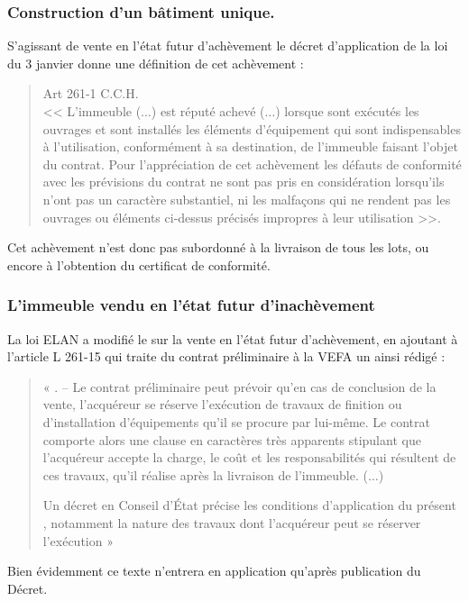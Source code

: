 		\subsubsection{Construction d'un bâtiment unique.}
		
			S'agissant de vente en l'état futur d'achèvement le décret d'application de la loi du 3 janvier donne une définition de cet achèvement :
			\begin{quote}
			Art 261-1 C.C.H.\\
			<< L'immeuble ($\dots$) est réputé achevé ($\dots$) lorsque sont exécutés les ouvrages et sont installés les éléments d'équipement qui sont indispensables à l'utilisation, conformément à sa destination, de l'immeuble faisant l'objet du contrat. Pour l'appréciation de cet achèvement les défauts de conformité avec les prévisions du contrat ne sont pas pris en considération lorsqu'ils n'ont pas un caractère substantiel, ni les malfaçons qui ne rendent pas les ouvrages ou éléments ci-dessus précisés impropres à leur utilisation >>.
			\end{quote}

			Cet achèvement n’est donc pas subordonné à la livraison de tous les lots, ou encore à l’obtention du certificat de conformité.
		
		\subsubsection{L’immeuble vendu en l’état futur d’inachèvement}
		
			La loi ELAN a modifié le \CCH sur la vente en l’état futur d’achèvement, en ajoutant à l’article L 261-15 qui traite du contrat préliminaire à la VEFA un \II{} ainsi rédigé :
			\begin{quote}
				« \II{}. – Le contrat préliminaire peut prévoir qu’en cas de conclusion de la vente, l’acquéreur se réserve l’exécution de travaux de finition ou d’installation d’équipements qu’il se procure par lui-même. Le contrat comporte alors une clause en caractères très apparents stipulant que l’acquéreur accepte la charge, le coût et les responsabilités qui résultent de ces travaux, qu’il réalise après la livraison de l’immeuble. ($\dots$)
				
				Un décret en Conseil d’État précise les conditions d’application du présent \II{}, notamment la nature des travaux dont l’acquéreur peut se réserver l’exécution »
			\end{quote}
			
			Bien évidemment ce texte n’entrera en application qu’après publication du Décret.
			
